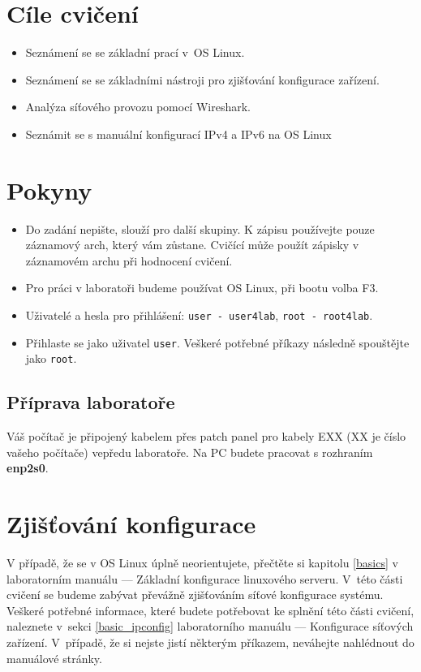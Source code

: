 \section*{Cíle cvičení}
\begin{itemize}
	\item Seznámení se se základní prací v~OS Linux.
	\item Seznámení se se základními nástroji pro zjišťování konfigurace zařízení.
	\item Analýza síťového provozu pomocí Wireshark.
	\item Seznámit se s manuální konfigurací IPv4 a IPv6 na OS Linux
\end{itemize}

\section*{Pokyny}
\begin{itemize}
\item Do zadání nepište, slouží pro další skupiny. K zápisu používejte pouze
  záznamový arch, který vám zůstane. Cvičící může použít zápisky v záznamovém
    archu při hodnocení cvičení.
\item Pro práci v laboratoři budeme používat OS Linux, při bootu volba F3.
\item Uživatelé a hesla pro přihlášení: \texttt{user - user4lab}, \texttt{root - root4lab}.
\item Přihlaste se jako uživatel \texttt{user}. Veškeré potřebné příkazy následně spouštějte jako \texttt{root}.
\end{itemize}

\subsection*{Příprava laboratoře}
Váš počítač je připojený kabelem přes patch panel
pro kabely EXX (XX je číslo vašeho počítače) vepředu laboratoře. Na PC budete
pracovat s rozhraním {\bf enp2s0}.

\section{Zjišťování konfigurace}
V případě, že se v OS Linux úplně neorientujete, přečtěte si kapitolu \ref{basics} v
laboratorním manuálu --- Základní konfigurace linuxového serveru. V~této části cvičení se
budeme zabývat převážně zjišťováním síťové konfigurace systému. Veškeré potřebné
informace, které budete potřebovat ke splnění této části cvičení, naleznete
v~sekci \ref{basic_ipconfig} laboratorního manuálu --- Konfigurace síťových zařízení. V~případě, že si nejste jistí některým příkazem, neváhejte nahlédnout do manuálové stránky.

